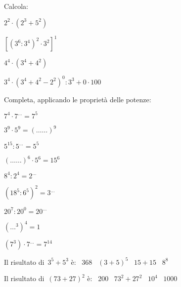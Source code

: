 \begin{esercizio}
\label{ese:1.12}
Calcola:
 \begin{multicols}{2}
 \begin{enumeratea}
 \item $2^2\cdot(2^3+5^2)$
 \item $[(3^6:3^4)^2\cdot3^2]^1$
 \item $4^4\cdot(3^4+4^2)$
 \item $3^4\cdot(3^4+4^2-2^2)^0:3^3+0\cdot100$
 \end{enumeratea}
 \end{multicols}
\end{esercizio}

\begin{esercizio}
\label{ese:1.13}
 Completa, applicando le proprietà delle potenze:
\begin{multicols}{3}
 \begin{enumeratea}
 \item $7^4\cdot7^{\ldots}=7^5$
 \item $3^9\cdot5^9=(\ldots\ldots)^9$
 \item $5^{15}:5^{\ldots}=5^5$
 \item $(\ldots\ldots)^6\cdot5^6=15^6$
 \item $8^4:2^4=2^{\ldots}$
 \item $(18^5:6^5)^2=3^{\ldots}$
 \item $20^7:20^0=20^{\ldots}$
 \item $(\ldots^3)^4=1$
 \item $(7^3) \cdot 7^{\dots}=7^{14}$
 \end{enumeratea}
\end{multicols}
\end{esercizio}

\begin{esercizio}
\label{ese:1.14}
 Il risultato di~$3^5+5^3$ è: \quad \quad \quad \quad
 \boxA\enspace~368 \quad \boxB\enspace~$(3+5)^5$ \quad \boxC\enspace~$15+15$ \quad \boxD\enspace~$8^8$
 \end{esercizio}

\begin{esercizio}
\label{ese:1.15}
 Il risultato di~$(73+27)^2$ è: \quad \quad
 \boxA\enspace~200 \quad\boxB\enspace~$73^2+27^2$ \quad\boxC\enspace~$10^4$ \quad\boxD\enspace~$1000$
\end{esercizio}

\newpage

